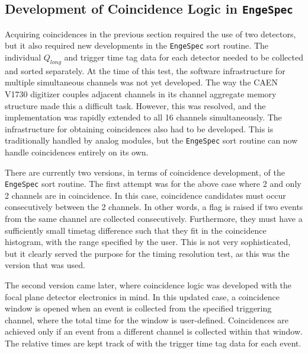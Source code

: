 

\subsection{Development of Coincidence Logic in \texttt{EngeSpec}} \label{subsec:coincidences}


Acquiring coincidences in the previous section required the use of two detectors, but it also required new developments in the \texttt{EngeSpec} sort routine. The individual $Q_{long}$ and trigger time tag data for each detector needed to be collected and sorted separately. At the time of this test, the software infrastructure for multiple simultaneous channels was not yet developed. The way the CAEN V1730 digitizer couples adjacent channels in its channel aggregate memory structure made this a difficult task. However, this was resolved, and the implementation was rapidly extended to all 16 channels simultaneously. The infrastructure for obtaining coincidences also had to be developed. This is traditionally handled by analog modules, but the \texttt{EngeSpec} sort routine can now handle coincidences entirely on its own. 

There are currently two versions, in terms of coincidence development, of the \texttt{EngeSpec} sort routine. The first attempt was for the above case where 2 and only 2 channels are in coincidence. In this case, coincidence candidates must occur consecutively between the 2 channels. In other words, a flag is raised if two events from the same channel are collected consecutively. Furthermore, they must have a sufficiently small timetag difference such that they fit in the coincidence histogram, with the range specified by the user. This is not very sophisticated, but it clearly served the purpose for the timing resolution test, as this was the version that was used. 

The second version came later, where coincidence logic was developed with the focal plane detector electronics in mind. In this updated case, a coincidence window is opened when an event is collected from the specified triggering channel, where the total time for the window is user-defined. Coincidences are achieved only if an event from a different channel is collected within that window. The relative times are kept track of with the trigger time tag data for each event.

